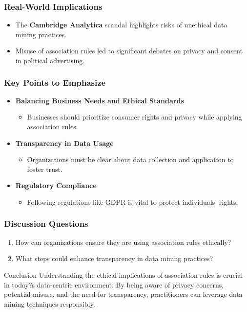 \documentclass[aspectratio=169]{beamer}
\begin{document}
\begin{frame}[fragile]
    \frametitle{Real-World Implications}
    \begin{itemize}
        \item The \textbf{Cambridge Analytica} scandal highlights risks of unethical data mining practices.
        \item Misuse of association rules led to significant debates on privacy and consent in political advertising.
    \end{itemize}
\end{frame}

\begin{frame}[fragile]
    \frametitle{Key Points to Emphasize}
    \begin{itemize}
        \item \textbf{Balancing Business Needs and Ethical Standards}
            \begin{itemize}
                \item Businesses should prioritize consumer rights and privacy while applying association rules.
            \end{itemize}
        \item \textbf{Transparency in Data Usage}
            \begin{itemize}
                \item Organizations must be clear about data collection and application to foster trust.
            \end{itemize}
        \item \textbf{Regulatory Compliance}
            \begin{itemize}
                \item Following regulations like GDPR is vital to protect individuals' rights.
            \end{itemize}
    \end{itemize}
\end{frame}

\begin{frame}[fragile]
    \frametitle{Discussion Questions}
    \begin{enumerate}
        \item How can organizations ensure they are using association rules ethically?
        \item What steps could enhance transparency in data mining practices?
    \end{enumerate}

    \begin{block}{Conclusion}
    Understanding the ethical implications of association rules is crucial in today?s data-centric environment. By being aware of privacy concerns, potential misuse, and the need for transparency, practitioners can leverage data mining techniques responsibly.
    \end{block}
\end{frame}
\end{document}
